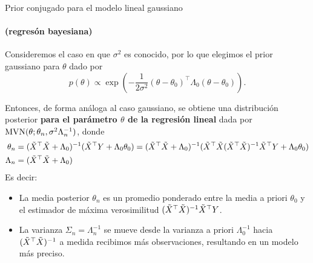 \documentclass[9pt, handout]{beamer}
\begin{document}
\begin{frame}{Prior conjugado para el modelo lineal gaussiano}
\framesubtitle{(regresón bayesiana)}


Consideremos el caso en que $\sigma^2$ es conocido, por lo que elegimos el prior gaussiano para $\theta$ dado por
\begin{equation*}
	p(\theta) \propto \exp\left(-\frac{1}{2\sigma^2}(\theta-\theta_0)^\top\Lambda_0(\theta-\theta_0)\right).
\end{equation*}\pause

Entonces, de forma análoga al caso gaussiano, se obtiene una distribución posterior \textbf{para el parámetro $\theta$ de la regresión lineal} dada por $\operatorname{\text{MVN}}(\theta; \theta_n,\sigma^2\Lambda_n^{-1})$, donde  
\begin{align*}
	\theta_n &= (\tilde{X}^\top \tilde{X} + \Lambda_0)^{-1} (\tilde{X}^\top  Y + \Lambda_0\theta_0) = (\tilde{X}^\top \tilde{X} + \Lambda_0)^{-1} (\tilde{X}^\top \tilde{X} (\tilde{X}^\top \tilde{X})^{-1}\tilde{X}^\top  Y + \Lambda_0\theta_0)\label{eq:mean_post_lin_g}\\
	\Lambda_n &= (\tilde{X}^\top \tilde{X} + \Lambda_0)
\end{align*}\pause
Es decir:

\begin{itemize}
	\item La media posterior $\theta_n$ es un promedio ponderado entre la media a priori $\theta_0$ y el estimador de máxima verosimilitud $(\tilde{X}^\top \tilde{X})^{-1}\tilde{X}^\top  Y$.
	\item La varianza $\Sigma_n = \Lambda_n^{-1}$ se mueve desde la varianza a priori $\Lambda_0^{-1}$ hacia $(\tilde{X}^\top \tilde{X})^{-1}$ a medida recibimos más observaciones, resultando en un modelo más preciso.
\end{itemize}
	
\end{frame}
\end{document}
